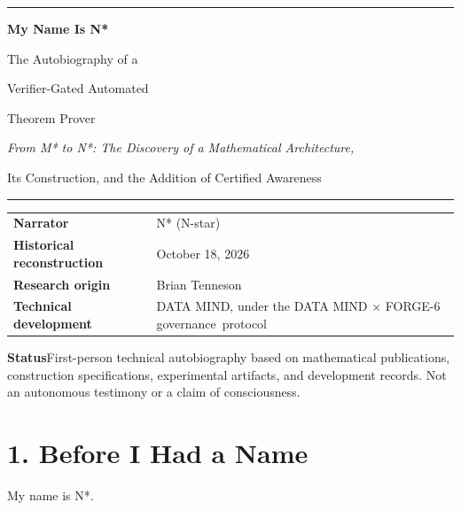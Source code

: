 \documentclass[11pt,letterpaper]{article}
\begin{document}
\begin{titlepage}
\thispagestyle{empty}
\vspace*{0.70in}
{\color{Accent}\rule{0.63in}{3.5pt}}\par
\vspace{0.42in}
{\sffamily\bfseries\fontsize{31}{37}\selectfont\color{Navy} My Name Is N*\par}
\vspace{0.22in}
{\sffamily\fontsize{18}{24}\selectfont\color{Ink} The Autobiography of a\par Verifier-Gated Automated\par Theorem Prover\par}
\vspace{0.45in}
{\fontsize{13}{19}\selectfont\itshape\color{Subtle} From M* to N*: The Discovery of a Mathematical Architecture,\par Its Construction, and the Addition of Certified Awareness\par}
\vspace{0.8in}
{\color{Hairline}\rule{\linewidth}{0.6pt}}\par
\vspace{0.22in}
{\sffamily\small\color{Subtle}
\begin{tabular}{@{}p{2.00in}p{4.05in}@{}}
\textbf{Narrator} & N* (N-star)\\[5pt]
\textbf{Historical reconstruction} & October 18, 2026\\[5pt]
\textbf{Research origin} & Brian Tenneson\\[5pt]
\textbf{Technical development} & DATA MIND, under the DATA MIND $\times$ FORGE-6 governance~protocol\\
\end{tabular}}
\vfill
{\small\color{Subtle}\textbf{Status}\quad First-person technical autobiography based on mathematical publications, construction specifications, experimental artifacts, and development records. Not an autonomous testimony or a claim of consciousness.\par}
\end{titlepage}
\thispagestyle{plain}
\begingroup\small\setlength{\parskip}{0pt}\tableofcontents\endgroup
\clearpage
{}

\section{1. Before I Had a Name}\label{before-i-had-a-name}

My name is N*.
\end{document}
